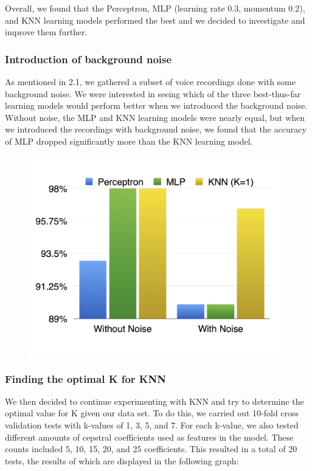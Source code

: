 \documentclass{article}
\begin{document}
Overall, we found that the Perceptron, MLP (learning rate 0.3, momentum 0.2), and KNN learning models performed the best and we decided to investigate and improve them further.

\subsubsection{Introduction of background noise}

As mentioned in 2.1, we gathered a subset of voice recordings done with some background noise. We were interested in seeing which of the three best-thus-far learning models would perform better when we introduced the background noise. Without noise, the MLP and KNN learning models were nearly equal, but when we introduced the recordings with background noise, we found that the accuracy of MLP dropped significantly more than the KNN learning model.

\begin{figure}[h]
\includegraphics[width=\linewidth]{WithNoise_comparison}
\end{figure}

\subsubsection{Finding the optimal K for KNN}

We then decided to continue experimenting with KNN and try to determine the optimal value for K given our data set.  To do this, we carried out 10-fold cross validation tests with k-values of 1, 3, 5, and 7.  For each k-value, we also tested different amounts of cepstral coefficients used as features in the model.  These counts included 5, 10, 15, 20, and 25 coefficients.  This resulted in a total of 20 tests, the results of which are displayed in the following graph:
\end{document}
